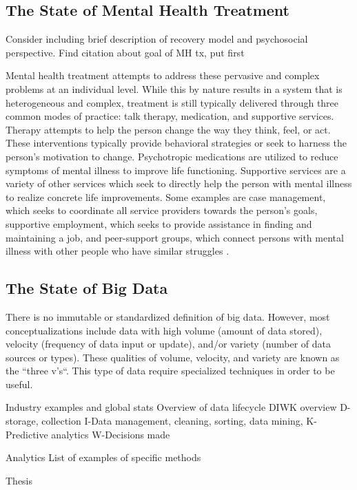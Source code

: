 \documentclass[sigconf]{acmart}
\begin{document}
\subsection{The State of Mental Health Treatment}
Consider including brief description of recovery model and psychosocial perspective. Find citation about goal of MH tx, put first

Mental health treatment attempts to address these pervasive and complex problems at an individual level. While this by nature results in a system that is heterogeneous and complex, treatment is still typically delivered through three common modes of practice: talk therapy, medication, and supportive services. Therapy attempts to help the person change the way they think, feel, or act. These interventions typically provide behavioral strategies or seek to harness the person's motivation to change. Psychotropic medications are utilized to reduce symptoms of mental illness to improve life functioning. Supportive services are a variety of other services which seek to directly help the person with mental illness to realize concrete life improvements. Some examples are case management, which seeks to coordinate all service providers towards the person's goals, supportive employment, which seeks to provide assistance in finding and maintaining a job, and peer-support groups, which connect persons with mental illness with other people who have similar struggles \cite{samhsatx}.

\subsection{The State of Big Data}

There is no immutable or standardized definition of big data. However, most conceptualizations include data with high volume (amount of data stored), velocity (frequency of data input or update), and/or variety (number of data sources or types). These qualities of volume, velocity, and variety are known as the ``three v's``. This type of data require specialized techniques in order to be useful\cite{BDConcepts}.


Industry examples and global stats
Overview of data lifecycle
    DIWK overview
    D-storage, collection
    I-Data management, cleaning, sorting, data mining, 
    K-Predictive analytics
    W-Decisions made
    
Analytics 
    List of examples of specific methods
    

Thesis
\end{document}
